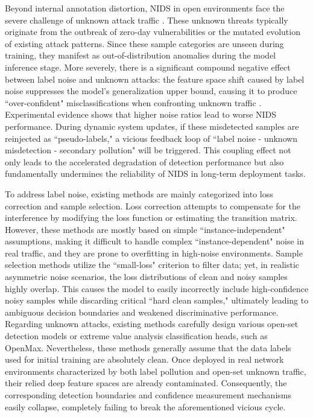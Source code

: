 \documentclass{SCIS2026}
\begin{document}
Beyond internal annotation distortion, NIDS in open environments face the severe challenge of unknown attack traffic \cite{SEEN}. These unknown threats typically originate from the outbreak of zero-day vulnerabilities or the mutated evolution of existing attack patterns. Since these sample categories are unseen during training, they manifest as out-of-distribution anomalies during the model inference stage. More severely, there is a significant compound negative effect between label noise and unknown attacks: the feature space shift caused by label noise suppresses the model's generalization upper bound, causing it to produce ``over-confident" misclassifications when confronting unknown traffic \cite{add_3_2, add_3_3}. Experimental evidence shows that higher noise ratios lead to worse NIDS performance. During dynamic system updates, if these misdetected samples are reinjected as ``pseudo-labels," a vicious feedback loop of ``label noise - unknown misdetection - secondary pollution" will be triggered. This coupling effect not only leads to the accelerated degradation of detection performance but also fundamentally undermines the reliability of NIDS in long-term deployment tasks.


To address label noise, existing methods are mainly categorized into loss correction and sample selection. Loss correction attempts to compensate for the interference by modifying the loss function or estimating the transition matrix. However, these methods are mostly based on simple ``instance-independent" assumptions, making it difficult to handle complex ``instance-dependent" noise in real traffic, and they are prone to overfitting in high-noise environments. Sample selection methods utilize the ``small-loss" criterion to filter data; yet, in realistic asymmetric noise scenarios, the loss distributions of clean and noisy samples highly overlap. This causes the model to easily incorrectly include high-confidence noisy samples while discarding critical ``hard clean samples," ultimately leading to ambiguous decision boundaries and weakened discriminative performance. Regarding unknown attacks, existing methods carefully design various open-set detection models or extreme value analysis classification heads, such as OpenMax. Nevertheless, these methods generally assume that the data labels used for initial training are absolutely clean. Once deployed in real network environments characterized by both label pollution and open-set unknown traffic, their relied deep feature spaces are already contaminated. Consequently, the corresponding detection boundaries and confidence measurement mechanisms easily collapse, completely failing to break the aforementioned vicious cycle.
\end{document}
